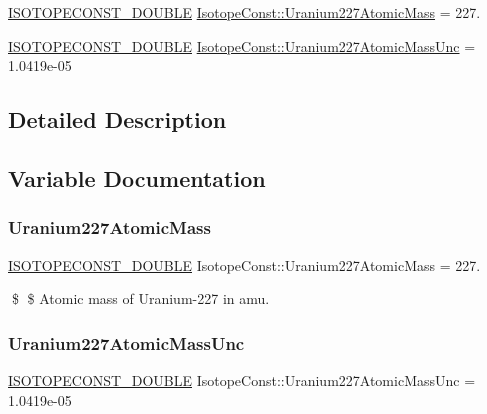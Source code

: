 \begin{DoxyCompactItemize}
\item 
\mbox{\hyperlink{group___isotope_const-_macros_ga8f45a7272ce02c0b4c65c44636ed719a}{I\+S\+O\+T\+O\+P\+E\+C\+O\+N\+S\+T\+\_\+\+D\+O\+U\+B\+LE}} \mbox{\hyperlink{group___isotope_const-_uranium-_u227_ga35abf59cb6eee348fda173316e6b7917}{Isotope\+Const\+::\+Uranium227\+Atomic\+Mass}} = 227.
\item 
\mbox{\hyperlink{group___isotope_const-_macros_ga8f45a7272ce02c0b4c65c44636ed719a}{I\+S\+O\+T\+O\+P\+E\+C\+O\+N\+S\+T\+\_\+\+D\+O\+U\+B\+LE}} \mbox{\hyperlink{group___isotope_const-_uranium-_u227_gacae4cca8e629f1e00421111804be7dff}{Isotope\+Const\+::\+Uranium227\+Atomic\+Mass\+Unc}} = 1.\+0419e-\/05
\end{DoxyCompactItemize}


\subsection{Detailed Description}


\subsection{Variable Documentation}
\mbox{\label{group___isotope_const-_uranium-_u227_ga35abf59cb6eee348fda173316e6b7917}} 
\subsubsection{\texorpdfstring{Uranium227\+Atomic\+Mass}{Uranium227AtomicMass}}
{\footnotesize\ttfamily \mbox{\hyperlink{group___isotope_const-_macros_ga8f45a7272ce02c0b4c65c44636ed719a}{I\+S\+O\+T\+O\+P\+E\+C\+O\+N\+S\+T\+\_\+\+D\+O\+U\+B\+LE}} Isotope\+Const\+::\+Uranium227\+Atomic\+Mass = 227.}

\$ \$ Atomic mass of Uranium-\/227 in amu. \mbox{\label{group___isotope_const-_uranium-_u227_gacae4cca8e629f1e00421111804be7dff}} 
\subsubsection{\texorpdfstring{Uranium227\+Atomic\+Mass\+Unc}{Uranium227AtomicMassUnc}}
{\footnotesize\ttfamily \mbox{\hyperlink{group___isotope_const-_macros_ga8f45a7272ce02c0b4c65c44636ed719a}{I\+S\+O\+T\+O\+P\+E\+C\+O\+N\+S\+T\+\_\+\+D\+O\+U\+B\+LE}} Isotope\+Const\+::\+Uranium227\+Atomic\+Mass\+Unc = 1.\+0419e-\/05}

